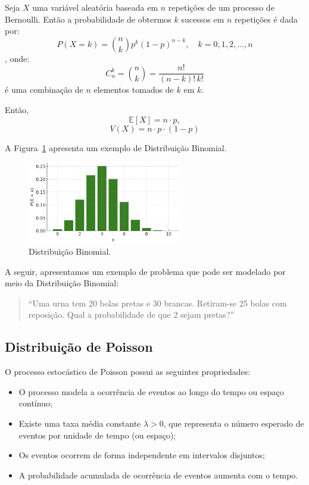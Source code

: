\documentclass{article}
\begin{document}
Seja $X$ uma variável aleatória baseada em $n$ repetições de um processo de Bernoulli.  
Então a probabilidade de obtermos $k$ sucessos em $n$ repetições é dada por:
    $$
    P(X = k) = \binom{n}{k} p^k (1 - p)^{n - k}, \quad k = 0, 1, 2, \ldots, n
    $$,
onde:
    $$
    C_n^k = \binom{n}{k} = \frac{n!}{(n - k)! \, k!}
    $$
é uma combinação de $n$ elementos tomados de $k$ em $k$.

Então,
    $$
    \mathbb{E}[X] = n \cdot p,
    $$
    $$
    V(X) = n \cdot p \cdot (1-p)
    $$

A Figura~\ref{fig:dist_disc_binomial} apresenta um exemplo de Distribuição Binomial.

\begin{figure}[H]
    \centering
    \includegraphics[width=0.6\textwidth]{figuras/dist_disc_binomial.png}
    \caption{Distribuição Binomial.}
    \label{fig:dist_disc_binomial}
\end{figure}

A seguir, apresentamos um exemplo de problema que pode ser modelado por meio da Distribuição Binomial:
\begin{quote}
``Uma urna tem 20 bolas pretas e 30 brancas. Retiram-se 25 bolas com reposição. Qual a probabilidade de que 2 sejam pretas?''
\end{quote}

\subsection{Distribuição de Poisson}
O processo estocástico de Poisson possui as seguintes propriedades:
\begin{itemize}
    \item O processo modela a ocorrência de eventos ao longo do tempo ou espaço contínuo;
    \item Existe uma taxa média constante $\lambda > 0$, que representa o número esperado de eventos por unidade de tempo (ou espaço);
    \item Os eventos ocorrem de forma independente em intervalos disjuntos;
    \item A probabilidade acumulada de ocorrência de eventos aumenta com o tempo.
\end{itemize}
\end{document}
